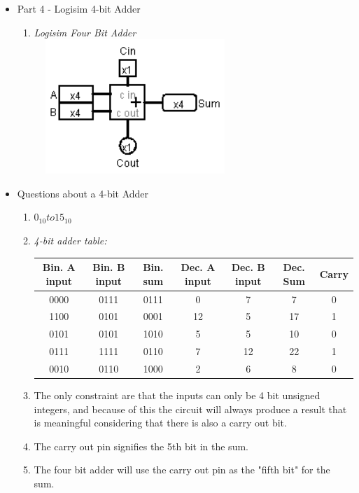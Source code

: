 \documentclass{article}
\begin{document}
\begin{itemize}
\begin{enumerate}
   \end{enumerate}
  \item Part 4 - Logisim 4-bit Adder
    \begin{enumerate}
      \item \textit{Logisim Four Bit Adder}\\
      \includegraphics[height=2in,width=3in]{logisim4bitadder.png}
    \end{enumerate}
  \item Questions about a 4-bit Adder
    \begin{enumerate}
      \item
        $0_{10} to 15_{10}$
      \item \textit{4-bit adder table:}
        \begin{center}
        \begin{tabular}{|c|c|c|c|c|c|c|}
          \hline
          Bin. A input & 
          Bin. B input & 
          Bin. sum & 
          Dec. A input & 
          Dec. B input &
          Dec. Sum &
          Carry\\ \hline
          0000 & 0111 & 0111 & 0  & 7  & 7  & 0 \\
          1100 & 0101 & 0001 & 12 & 5  & 17 & 1 \\
          0101 & 0101 & 1010 & 5  & 5  & 10 & 0 \\
          0111 & 1111 & 0110 & 7  & 12 & 22 & 1 \\
          0010 & 0110 & 1000 & 2  & 6  & 8  & 0 \\ \hline
        \end{tabular}
        \end{center}
      \item The only constraint are that the inputs can only be 4 bit unsigned integers, and because of this the circuit will always produce a result that is meaningful considering that there is also a carry out bit.
      \item The carry out pin signifies the 5th bit in the sum.
      \item The four bit adder will use the carry out pin as the "fifth bit" for the sum.
    \end{enumerate}
    
\end{itemize}
\end{document}
